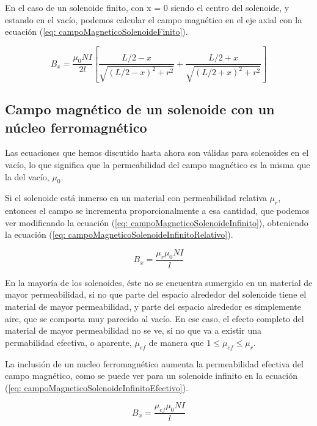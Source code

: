 \documentclass[a4paper,12pt]{article}
\begin{document}
        En el caso de un solenoide finito, con x = 0 siendo el centro del solenoide, y estando en el vacío, podemos calcular el campo magnético en el eje axial con la ecuación (\ref{eq: campoMagneticoSolenoideFinito}).

        \begin{equation}
            \label{eq: campoMagneticoSolenoideFinito}
            B_x = \frac{\mu_0 N I}{2l} \left[ \frac{L/2 - x}{\sqrt{(L/2 - x)^2 + r^2}} + \frac{L/2 + x}{\sqrt{(L/2 + x)^2 + r^2}} \right]
        \end{equation}

    \subsection*{Campo magnético de un solenoide con un núcleo ferromagnético}

        Las ecuaciones que hemos discutido hasta ahora son válidas para solenoides en el vacío, lo que significa que la permeabilidad del campo magnético es la misma que la del vacío, $\mu_0$.

        Si el solenoide está inmerso en un material con permeabilidad relativa $\mu_r$, entonces el campo se incrementa proporcionalmente a esa cantidad, que podemos ver modificando la ecuación (\ref{eq: campoMagneticoSolenoideInfinito}), obteniendo la ecuación (\ref{eq: campoMagneticoSolenoideInfinitoRelativo}).

        \begin{equation}
            \label{eq: campoMagneticoSolenoideInfinitoRelativo}
            B_x = \frac{\mu_r\mu_0 N I}{l}
        \end{equation}

        En la mayoría de los solenoides, éste no se encuentra sumergido en un material de mayor permeabilidad, si no que parte del espacio alrededor del solenoide tiene el material de mayor permeabilidad, y parte del espacio alrededor es simplemente aire, que se comporta muy parecido al vacío. En ese caso, el efecto completo del material de mayor permeabilidad no se ve, si no que va a existir una permabilidad efectiva, o aparente, $\mu_{ef}$ de manera que $1 \leq \mu_{ef} \leq \mu_r$.

        La inclusión de un nucleo ferromagnético aumenta la permeabilidad efectiva del campo magnético, como se puede ver para un solenoide infinito en la ecuación (\ref{eq: campoMagneticoSolenoideInfinitoEfectivo}).

        \begin{equation}
            \label{eq: campoMagneticoSolenoideInfinitoEfectivo}
            B_x = \frac{\mu_{ef}\mu_0 N I}{l}
        \end{equation}
\end{document}
